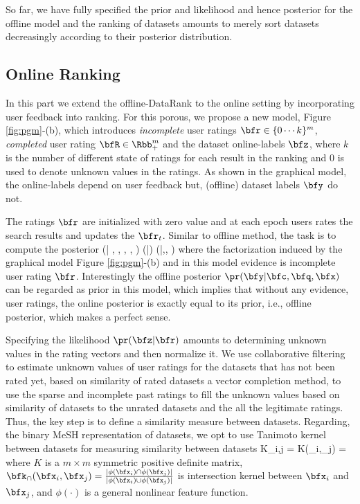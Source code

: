 \documentclass{amia}
\begin{document}
So far, we have fully specified the prior and likelihood and hence posterior for the offline model and the ranking of datasets amounts to merely sort datasets decreasingly according to their posterior distribution.
\subsection{Online Ranking}
In this part we extend the offline-DataRank to the online setting by incorporating user feedback into ranking. For this porous, we propose a new model, Figure \ref{fig:pgm}-(b), which introduces \emph{incomplete} user ratings $\bfr\in \{0\cdots k \}^{m}$, \emph{completed} user rating $\bfR \in \Rbb_+^m$ and the dataset online-labels $\bfz$, where $k$ is the number of different state of ratings for each result in the ranking and 0 is used to denote unknown values in the ratings. As shown in the graphical model, the online-labels depend on user feedback but, (offline) dataset labels $\bfy$ do not.

The ratings $\bfr$ are initialized with zero value and at each epoch users rates the search results and updates the $\bfr_t$. Similar to offline method, the task is to compute the posterior
\beq \label{eq:online-posterior}
\pr (\bfz | \bfr, \bfy, \bfc, \bfq, \bfx)  \propto  \pr (\bfz |\bfr) \pr (\bfy |\bfc,\bfq, \bfx)
\eeq
where the factorization induced by the graphical model Figure \ref{fig:pgm}-(b) and in this model evidence is incomplete user rating $\bfr$. Interestingly the offline posterior $\pr (\bfy |\bfc,\bfq, \bfx)$ can be regarded as prior in this model, which implies that without any evidence, user ratings, the online posterior is exactly equal to its prior, i.e., offline posterior, which makes a perfect sense.

Specifying the likelihood $\pr (\bfz |\bfr)$ amounts to determining unknown values in the rating vectors and then normalize it.
We use collaborative filtering \cite{CF-survey} to estimate unknown values of user ratings for the datasets that has not been rated yet, based on similarity of rated datasets  a vector completion method, to use the sparse and incomplete past ratings to fill the unknown values based on similarity of datasets to the unrated datasets and the all the legitimate ratings. Thus, the key step is to define a similarity measure between datasets. 
Regarding, the binary MeSH representation of datasets, we opt to use Tanimoto kernel \cite{t-kernel} between datasets for measuring similarity between datasets
\beq
K_{i,j} = K(\bfx_i,\bfx_j) =  
\eeq
where $K$ is a $m \times m$ symmetric positive definite matrix, $\bfk_\cap(\bfx_i,\bfx_j)=\frac{|\phi(\bfx_i) \cap \phi(\bfx_j) |}{|\phi(\bfx_i) \cup \phi(\bfx_j)| }$ is intersection kernel \cite{i-kernel} between $\bfx_i$ and $\bfx_j$, and $\phi(\cdot)$ is a general nonlinear feature function. 
\end{document}
